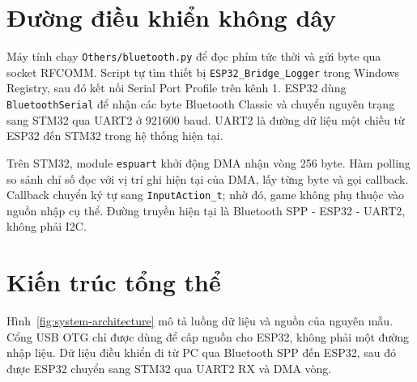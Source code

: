 \section{Đường điều khiển không dây}

Máy tính chạy \texttt{Others/bluetooth.py} để đọc phím tức thời và gửi byte qua socket RFCOMM\@. Script tự tìm thiết bị \texttt{ESP32\_Bridge\_Logger} trong Windows Registry, sau đó kết nối Serial Port Profile trên kênh 1. ESP32 dùng \texttt{BluetoothSerial} để nhận các byte Bluetooth Classic và chuyển nguyên trạng sang STM32 qua UART2 ở 921600 baud. UART2 là đường dữ liệu một chiều từ ESP32 đến STM32 trong hệ thống hiện tại.

Trên STM32, module \texttt{espuart} khởi động DMA nhận vòng 256 byte. Hàm polling so sánh chỉ số đọc với vị trí ghi hiện tại của DMA, lấy từng byte và gọi callback. Callback chuyển ký tự sang \texttt{InputAction\_t}; nhờ đó, game không phụ thuộc vào nguồn nhập cụ thể. Đường truyền hiện tại là Bluetooth SPP - ESP32 - UART2, không phải I2C.

\section{Kiến trúc tổng thể}

Hình~\ref{fig:system-architecture} mô tả luồng dữ liệu và nguồn của nguyên mẫu. Cổng USB OTG chỉ được dùng để cấp nguồn cho ESP32, không phải một đường nhập liệu. Dữ liệu điều khiển đi từ PC qua Bluetooth SPP đến ESP32, sau đó được ESP32 chuyển sang STM32 qua UART2 RX và DMA vòng.

